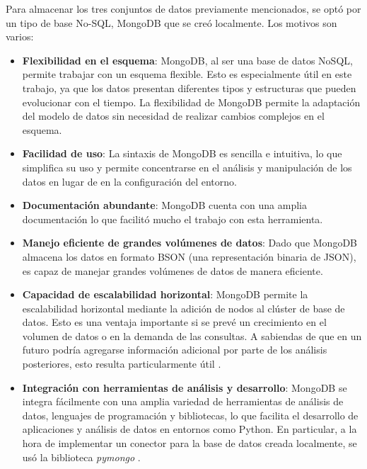 \documentclass[11pt,a4paper,twoside,openany]{tesis}
\begin{document}
Para almacenar los tres conjuntos de datos previamente mencionados, se optó por un tipo de base No-SQL, MongoDB que se creó localmente. Los motivos son varios:
\begin{itemize}
    \item \textbf{Flexibilidad en el esquema}: MongoDB, al ser una base de datos NoSQL, permite trabajar con un esquema flexible. Esto es especialmente útil en este trabajo, ya que los datos presentan diferentes tipos y estructuras que pueden evolucionar con el tiempo. La flexibilidad de MongoDB permite la adaptación del modelo de datos sin necesidad de realizar cambios complejos en el esquema.
    
    \item \textbf{Facilidad de uso}: La sintaxis de MongoDB es sencilla e intuitiva, lo que simplifica su uso y permite concentrarse en el análisis y manipulación de los datos en lugar de en la configuración del entorno.
    
    \item \textbf{Documentación abundante}: MongoDB cuenta con una amplia documentación lo que facilitó mucho el trabajo con esta herramienta. 
    
    \item \textbf{Manejo eficiente de grandes volúmenes de datos}: Dado que MongoDB almacena los datos en formato BSON (una representación binaria de JSON), es capaz de manejar grandes volúmenes de datos de manera eficiente.
    
    \item \textbf{Capacidad de escalabilidad horizontal}: MongoDB permite la escalabilidad horizontal mediante la adición de nodos al clúster de base de datos. Esto es una ventaja importante si se prevé un crecimiento en el volumen de datos o en la demanda de las consultas. A sabiendas de que en un futuro podría agregarse información adicional por parte de los análisis posteriores, esto resulta particularmente útil \cite{MongoDB-docs}.
    
    \item \textbf{Integración con herramientas de análisis y desarrollo}: MongoDB se integra fácilmente con una amplia variedad de herramientas de análisis de datos, lenguajes de programación y bibliotecas, lo que facilita el desarrollo de aplicaciones y análisis de datos en entornos como Python. En particular, a la hora de implementar un conector para la base de datos creada localmente, se usó la biblioteca \emph{pymongo} \cite{pymongo}.
\end{itemize}
\end{document}
